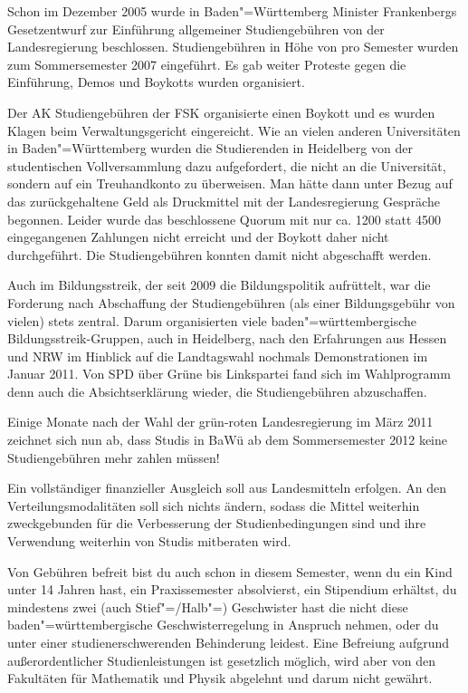 Schon im Dezember 2005 wurde in Baden"=Württemberg Minister Frankenbergs Gesetzentwurf zur Einführung allgemeiner
Studiengebühren von der
Landesregierung beschlossen. Studiengebühren in Höhe von  pro Semester
wurden zum Sommersemester 2007 eingeführt. Es gab weiter Proteste gegen
die Einführung, Demos und Boykotts wurden organisiert.

Der AK Studiengebühren der \gls{FSK} organisierte einen Boykott und es
wurden Klagen beim Verwaltungsgericht eingereicht. Wie an vielen anderen
Universitäten in Baden"=Württemberg wurden die Studierenden in Heidelberg von der studentischen Vollversammlung dazu aufgefordert, die
 nicht an die Universität, sondern auf ein Treuhandkonto zu überweisen. Man hätte dann unter Bezug auf das
zurückgehaltene Geld als Druckmittel mit der Landesregierung Gespräche begonnen.
Leider wurde das beschlossene Quorum mit nur ca. 1200 statt 4500 eingegangenen Zahlungen
nicht erreicht und der Boykott daher nicht durchgeführt. Die Studiengebühren konnten damit nicht abgeschafft werden.

Auch im Bildungsstreik, der seit 2009 die Bildungspolitik aufrüttelt, war die Forderung nach Abschaffung der Studiengebühren (als einer Bildungsgebühr von vielen) stets zentral. Darum organisierten viele baden"=württembergische Bildungsstreik-Gruppen, auch in Heidelberg, nach den Erfahrungen aus Hessen und NRW im Hinblick auf die Landtagswahl nochmals Demonstrationen im Januar 2011. Von SPD über Grüne bis Linkspartei fand sich im Wahlprogramm denn auch die Absichtserklärung wieder, die Studiengebühren abzuschaffen.

Einige Monate nach der Wahl der grün-roten Landesregierung im März 2011 zeichnet sich nun ab, dass Studis in BaWü ab dem Sommersemester 2012 keine Studiengebühren mehr zahlen müssen!

Ein vollständiger finanzieller Ausgleich soll aus Landesmitteln erfolgen. An den Verteilungsmodalitäten soll sich nichts ändern, sodass die Mittel weiterhin zweckgebunden für die Verbesserung der Studienbedingungen sind und ihre Verwendung weiterhin von Studis mitberaten wird.

Von Gebühren befreit bist du auch schon in diesem Semester, wenn du ein Kind unter 14 Jahren hast, ein Praxissemester absolvierst, ein Stipendium erhältst, du mindestens zwei (auch Stief"=/Halb"=) Geschwister hast die nicht diese baden"=württembergische Geschwisterregelung in Anspruch nehmen, oder du unter einer studienerschwerenden Behinderung leidest. Eine Befreiung aufgrund außerordentlicher Studienleistungen ist gesetzlich möglich, wird aber von den Fakultäten für Mathematik und Physik abgelehnt und darum nicht gewährt.


